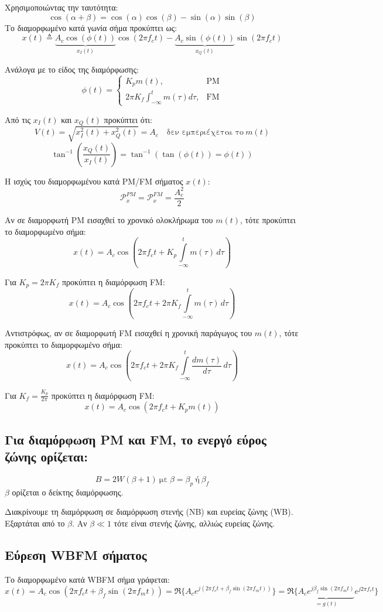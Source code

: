 \documentclass[a4paper,12pt]{article}
\begin{document}
Χρησιμοποιώντας την ταυτότητα:
\[
\cos(\alpha + \beta) = \cos(\alpha)\cos(\beta) - \sin(\alpha) \sin(\beta)
\]
Το διαμορφωμένο κατά γωνία σήμα προκύπτει ως:
\[
x(t) \triangleq \underbrace{A_c \cos(\phi (t))}_{x_I(t)} \cos(2\pi f_c t) - \underbrace{A_c \sin(\phi(t))}_{x_Q(t)} \sin(2\pi f_c t)
\]

Ανάλογα με το είδος της διαμόρφωσης:
\[
\phi(t)= \begin{cases}K_p m(t), & \mathrm{PM} \\ 2 \pi K_f \int_{-\infty}^t m(\tau) d \tau, & \mathrm{FM}\end{cases}
\]

Από τις \(x_I(t)\) και \(x_Q(t)\) προκύπτει ότι:
\[
V(t) = \sqrt{x_I^2(t)+x_Q^2(t)}=A_c \quad \text{δεν εμπεριέχεται το} \ m(t)
\]
\[
\tan^{-1} \left(\frac{x_Q(t)}{x_I(t)} \right) = \tan^{-1}(\tan(\phi(t))=\phi(t))
\]

Η ισχύς του διαμορφωμένου κατά PM/FM σήματος \(x(t)\):
\[
\mathcal{P}_x^{PM} = \mathcal{P}_x^{FM} = \frac{A_c^2}{2}
\]

Αν σε διαμορφωτή PM εισαχθεί το χρονικό ολοκλήρωμα του \(m(t)\), τότε προκύπτει το διαμορφωμένο σήμα:
\[
x(t)=A_c \cos(2\pi f_c t+ K_p \int\limits_{-\infty}^t m(\tau) \, d\tau)
\]

Για \(K_p = 2\pi K_f\) προκύπτει η διαμόρφωση FM:
\[
x(t)=A_c \cos(2\pi f_c t+2\pi K_f \int\limits_{-\infty}^t m(\tau) \, d\tau)
\]

Αντιστρόφως, αν σε διαμορφωτή FM εισαχθεί η χρονική παράγωγος του \(m(t)\), τότε προκύπτει το διαμορφωμένο σήμα:
\[
x(t)=A_c \cos (2\pi f_c t +2 \pi K_f \int\limits_{-\infty}^t \frac{dm(\tau)}{d\tau} \, d\tau)
\]

Για \(K_f=\frac{K_p}{2\pi}\) προκύπτει η διαμόρφωση FM:
\[
x(t) = A_c \cos(2\pi f_c t+ K_p m(t))
\]

\subsection*{Για διαμόρφωση PM και FM, το ενεργό εύρος ζώνης ορίζεται:}
\[
B=2W(\beta + 1) \ \text{με} \ \beta = \beta_p \ \text{ή} \ \beta_f
\]
\(\beta\) ορίζεται ο δείκτης διαμόρφωσης.

Διακρίνουμε τη διαμόρφωση σε διαμόρφωση στενής (NB) και ευρείας ζώνης (WB). Εξαρτάται από το \(\beta\). Αν \(\beta \ll 1\) τότε είναι στενής ζώνης, αλλιώς ευρείας ζώνης.

\subsection*{Εύρεση WBFM σήματος}
Το διαμορφωμένο κατά WBFM σήμα γράφεται:
\[
x(t)=A_c \cos(2 \pi f_c t + \beta_f \sin(2\pi f_m t)) = \Re\{A_c e^{j(2\pi f_c t +\beta_f \sin(2\pi f_m t))}\} = \Re\{\underbrace{A_c e^{j \beta_f \sin(2\pi f_m t)}}_{=g(t)} e^{j 2 \pi f_c t}\}
\]
\end{document}
